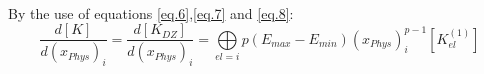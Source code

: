         \\
  By the use of equations \ref{eq.6},\ref{eq.7} and \ref{eq.8}:
  \begin{equation}
  \frac{d\left[K\right]}{d(x_{Phys})_i}=\frac{d\left[K_{DZ}\right]}{d(x_{Phys})_i}=\underset{el=i}{\bigoplus}{p(E_{max}-E_{min})(x_{Phys})_i^{p-1}\left[K_{el}^{(1)}\right]}
  \end{equation}
